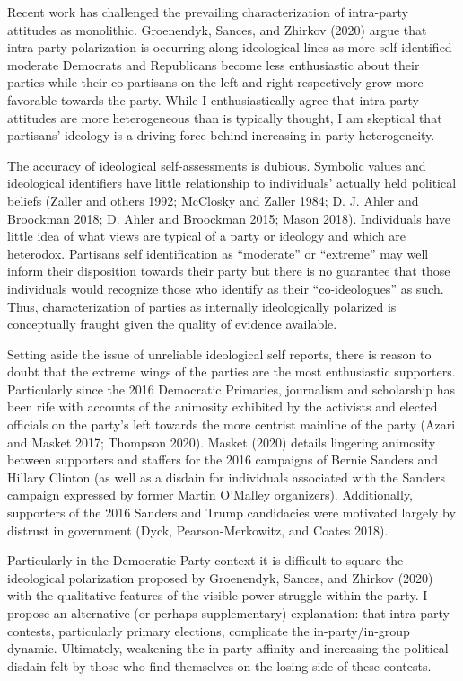 \documentclass[
]{article}
\begin{document}
Recent work has challenged the prevailing characterization of intra-party attitudes as monolithic. Groenendyk, Sances, and Zhirkov (2020) argue that intra-party polarization is occurring along ideological lines as more self-identified moderate Democrats and Republicans become less enthusiastic about their parties while their co-partisans on the left and right respectively grow more favorable towards the party. While I enthusiastically agree that intra-party attitudes are more heterogeneous than is typically thought, I am skeptical that partisans' ideology is a driving force behind increasing in-party heterogeneity.

The accuracy of ideological self-assessments is dubious. Symbolic values and ideological identifiers have little relationship to individuals' actually held political beliefs (Zaller and others 1992; McClosky and Zaller 1984; D. J. Ahler and Broockman 2018; D. Ahler and Broockman 2015; Mason 2018). Individuals have little idea of what views are typical of a party or ideology and which are heterodox. Partisans self identification as ``moderate'' or ``extreme'' may well inform their disposition towards their party but there is no guarantee that those individuals would recognize those who identify as their ``co-ideologues'' as such. Thus, characterization of parties as internally ideologically polarized is conceptually fraught given the quality of evidence available.

Setting aside the issue of unreliable ideological self reports, there is reason to doubt that the extreme wings of the parties are the most enthusiastic supporters. Particularly since the 2016 Democratic Primaries, journalism and scholarship has been rife with accounts of the animosity exhibited by the activists and elected officials on the party's left towards the more centrist mainline of the party (Azari and Masket 2017; Thompson 2020). Masket (2020) details lingering animosity between supporters and staffers for the 2016 campaigns of Bernie Sanders and Hillary Clinton (as well as a disdain for individuals associated with the Sanders campaign expressed by former Martin O'Malley organizers). Additionally, supporters of the 2016 Sanders and Trump candidacies were motivated largely by distrust in government (Dyck, Pearson-Merkowitz, and Coates 2018).

Particularly in the Democratic Party context it is difficult to square the ideological polarization proposed by Groenendyk, Sances, and Zhirkov (2020) with the qualitative features of the visible power struggle within the party. I propose an alternative (or perhaps supplementary) explanation: that intra-party contests, particularly primary elections, complicate the in-party/in-group dynamic. Ultimately, weakening the in-party affinity and increasing the political disdain felt by those who find themselves on the losing side of these contests.
\end{document}

